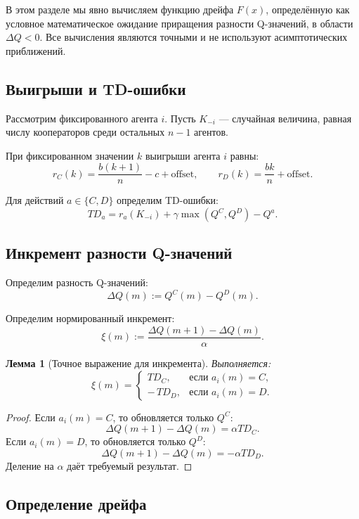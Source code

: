 \documentclass[12pt,a4paper]{article}
\newtheorem{lemma}{Лемма}
\theoremstyle{definition}
\begin{document}
В этом разделе мы явно вычисляем функцию дрейфа $F(x)$,
определённую как условное математическое ожидание
приращения разности Q-значений,
в области $\Delta Q < 0$.
Все вычисления являются точными и не используют асимптотических
приближений.

\subsection{Выигрыши и TD-ошибки}

Рассмотрим фиксированного агента $i$.
Пусть $K_{-i}$ — случайная величина, равная числу кооператоров
среди остальных $n-1$ агентов.

При фиксированном значении $k$ выигрыши агента $i$ равны:
\[
r_C(k) = \frac{b(k+1)}{n} - c + \mathrm{offset},
\qquad
r_D(k) = \frac{bk}{n} + \mathrm{offset}.
\]

Для действий $a\in\{C,D\}$ определим TD-ошибки:
\[
TD_a
=
r_a(K_{-i})
+
\gamma \max(Q^C,Q^D)
-
Q^a.
\]

\subsection{Инкремент разности Q-значений}

Определим разность Q-значений:
\[
\Delta Q(m) := Q^C(m)-Q^D(m).
\]

Определим нормированный инкремент:
\[
\xi(m)
:=
\frac{\Delta Q(m+1)-\Delta Q(m)}{\alpha}.
\]

\begin{lemma}[Точное выражение для инкремента]
Выполняется:
\[
\xi(m)
=
\begin{cases}
TD_C, & \text{если } a_i(m)=C,\\[0.3em]
-\,TD_D, & \text{если } a_i(m)=D.
\end{cases}
\]
\end{lemma}

\begin{proof}
Если $a_i(m)=C$, то обновляется только $Q^C$:
\[
\Delta Q(m+1)-\Delta Q(m)
=
\alpha TD_C.
\]
Если $a_i(m)=D$, то обновляется только $Q^D$:
\[
\Delta Q(m+1)-\Delta Q(m)
=
-\alpha TD_D.
\]
Деление на $\alpha$ даёт требуемый результат.
\end{proof}

\subsection{Определение дрейфа}
\end{document}
